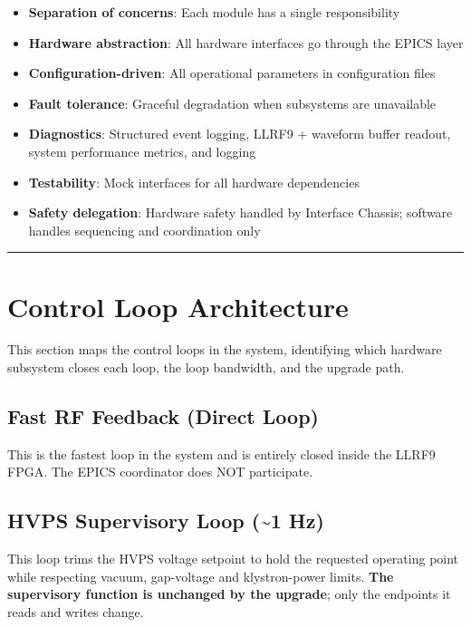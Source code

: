 \begin{itemize}
\tightlist
\item
  \textbf{Separation of concerns}: Each module has a single responsibility
\item
  \textbf{Hardware abstraction}: All hardware interfaces go through the EPICS layer
\item
  \textbf{Configuration-driven}: All operational parameters in configuration files
\item
  \textbf{Fault tolerance}: Graceful degradation when subsystems are unavailable
\item
  \textbf{Diagnostics}: Structured event logging, LLRF9 + waveform buffer readout, system performance metrics, and logging
\item
  \textbf{Testability}: Mock interfaces for all hardware dependencies
\item
  \textbf{Safety delegation}: Hardware safety handled by Interface Chassis; software handles sequencing and coordination only
\end{itemize}

\begin{center}\rule{0.5\linewidth}{0.5pt}\end{center}

\section{Control Loop Architecture}\label{control-loop-architecture}

This section maps the control loops in the system, identifying which hardware subsystem closes each loop, the loop bandwidth, and the upgrade path.

\subsection{Fast RF Feedback (Direct Loop)}\label{fast-rf-feedback-direct-loop}

This is the fastest loop in the system and is entirely closed inside the LLRF9 FPGA. The EPICS coordinator does NOT participate.

\subsection{HVPS Supervisory Loop (\textasciitilde1 Hz)}\label{hvps-supervisory-loop-1-hz}

This loop trims the HVPS voltage setpoint to hold the requested operating point while respecting vacuum, gap-voltage and klystron-power limits. \textbf{The supervisory function is unchanged by the upgrade}; only the endpoints it reads and writes change.

